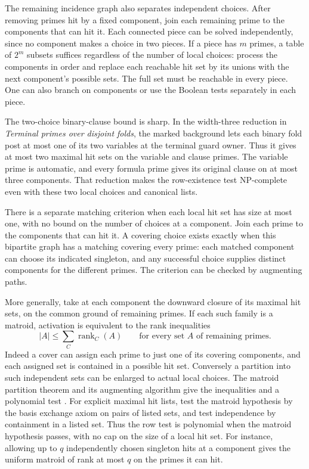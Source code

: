 The remaining incidence graph also separates independent
choices. After removing primes hit by a fixed component,
join each remaining prime to the components that can hit
it. Each connected piece can be solved independently,
since no component makes a choice in two pieces. If a
piece has $m$ primes, a table of $2^m$ subsets suffices
regardless of the number of local choices: process the
components in order and replace each reachable hit set
by its unions with the next component's possible sets.
The full set must be reachable in every piece. One can
also branch on components or use the Boolean tests
separately in each piece.

The two-choice binary-clause bound is sharp. In the
width-three reduction in \emph{Terminal primes over
disjoint folds}, the marked background lets each binary
fold post at most one of its two variables at the
terminal guard owner. Thus it gives at most two maximal
hit sets on the variable and clause primes. The variable
prime is automatic, and every formula prime gives its
original clause on at most three components. That
reduction makes the row-existence test NP-complete even
with these two local choices and canonical lists.

There is a separate matching criterion when each local hit
set has size at most one, with no bound on the number of
choices at a component. Join each prime to the components
that can hit it. A covering choice exists exactly when
this bipartite graph has a matching covering every prime:
each matched component can choose its indicated singleton,
and any successful choice supplies distinct components for
the different primes. The criterion can be checked by
augmenting paths.

More generally, take at each component the downward closure
of its maximal hit sets, on the common ground of remaining
primes. If each such family is a matroid, activation is
equivalent to the rank inequalities
\[
              |A|\le \sum_C \operatorname{rank}_C(A)
              \qquad\text{for every set $A$ of remaining primes}.
\]
Indeed a cover can assign each prime to just one of its
covering components, and each assigned set is contained
in a possible hit set. Conversely a partition into such
independent sets can be enlarged to actual local choices.
The matroid partition theorem and its augmenting algorithm
give the inequalities and a polynomial test
\cite[Theorem~1c]{EdmondsFulkerson1965}. For explicit maximal
hit lists, test the matroid hypothesis by the basis exchange
axiom on pairs of listed sets, and test independence by
containment in a listed set. Thus the row test is polynomial
when the matroid hypothesis passes, with no cap on the size
of a local hit set. For instance, allowing up to $q$ independently
chosen singleton hits at a component gives the uniform
matroid of rank at most $q$ on the primes it can hit.


